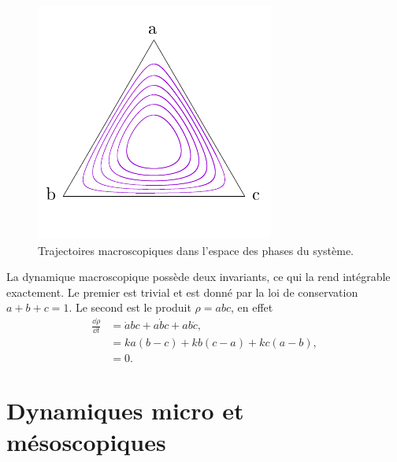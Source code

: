 \documentclass[openany,a4paper,12pt]{article}
\begin{document}
\begin{figure}
	\centering
	\includegraphics[width=0.7\linewidth]{figures/portrait}
	\caption{Trajectoires macroscopiques dans l'espace des phases du système.}
	\label{fig:portrait}
\end{figure}



\par La dynamique macroscopique possède deux invariants, ce qui la rend intégrable exactement. Le premier est trivial et est donné par la loi de conservation $a+b+c=1$. Le second est le produit $\rho = abc$, en effet
%
\begin{equation}\label{rho_invariant}
\begin{split}
	\frac{\dd \rho}{\dd t} 
	&= \dot a bc + a \dot b c + ab \dot c, \\
	&= ka(b-c) + kb(c-a) + kc(a-b), \\
	&= 0.
\end{split}
\end{equation}
%


\section{Dynamiques micro et mésoscopiques}
\label{section_micro}
\end{document}
